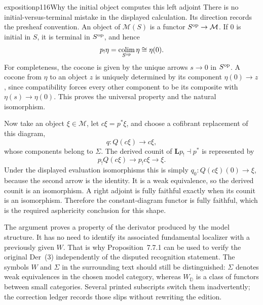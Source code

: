 \begin{dcomment}{exposition}{p116}{Why the initial object computes this left adjoint}
There is no initial-versus-terminal mistake in the displayed calculation. Its direction records the presheaf convention. An object of $\mathcal M(S)$ is a functor $S^{\rm op}\to\mathcal M$. If $0$ is initial in $S$, it is terminal in $S^{\rm op}$, and hence
\[
 p_!\eta=\mathop{\rm colim}_{S^{\rm op}}\eta\cong\eta(0).
\]
For completeness, the cocone is given by the unique arrows $s\to0$ in $S^{\rm op}$. A cocone from $\eta$ to an object $z$ is uniquely determined by its component $\eta(0)\to z$, since compatibility forces every other component to be its composite with $\eta(s)\to\eta(0)$. This proves the universal property and the natural isomorphism.

Now take an object $\xi\in\mathcal M$, let $c\xi=p^*\xi$, and choose a cofibrant replacement of this diagram,
\[
 q:Q(c\xi)\longrightarrow c\xi,
\]
whose components belong to $\Sigma$. The derived counit of $\mathbf Lp_!\dashv p^*$ is represented by
\[
 p_!Q(c\xi)\longrightarrow p_!c\xi\longrightarrow\xi.
\]
Under the displayed evaluation isomorphisms this is simply $q_0:Q(c\xi)(0)\to\xi$, because the second arrow is the identity. It is a weak equivalence, so the derived counit is an isomorphism. A right adjoint is fully faithful exactly when its counit is an isomorphism. Therefore the constant-diagram functor is fully faithful, which is the required asphericity conclusion for this shape.

The argument proves a property of the derivator produced by the model structure. It has no need to identify its associated fundamental localizer with a previously given $W$. That is why Proposition~7.7.1 can be used to verify the original Der~(3) independently of the disputed recognition statement. The symbols $W$ and $\Sigma$ in the surrounding text should still be distinguished: $\Sigma$ denotes weak equivalences in the chosen model category, whereas $W_{\mathbb D}$ is a class of functors between small categories. Several printed subscripts switch them inadvertently; the correction ledger records those slips without rewriting the edition.
\end{dcomment}

